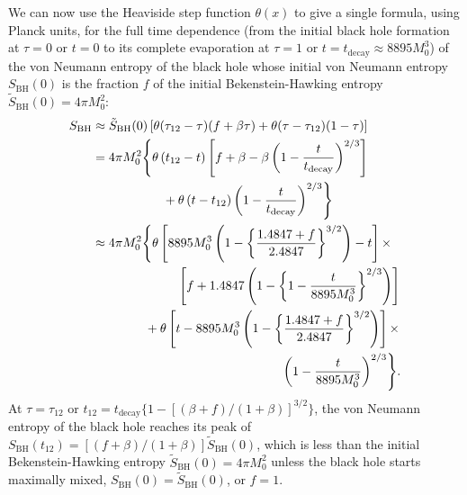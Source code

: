 \documentclass[12pt]{article}
\begin{document}
\newpage

We can now use the Heaviside step function $\theta(x)$ to give a single formula, using Planck units, for the full time dependence (from the initial black hole formation at $\tau = 0$ or $t=0$ to its complete evaporation at $\tau = 1$ or $t = t_\mathrm{decay} \approx 8895 M_0^3$) of the von Neumann entropy of the black hole whose initial von Neumann entropy $S_\mathrm{BH}(0)$ is the fraction $f$ of the initial Bekenstein-Hawking entropy $\tilde{S}_\mathrm{BH}(0) = 4\pi M_0^2$:
\begin{equation}
\begin{split}
S_\mathrm{BH} \approx {} &
\tilde{S}_\mathrm{BH}(0)
\left[\theta(\tau_{12}-\tau)(f+\beta\tau) + \theta(\tau-\tau_{12})(1-\tau)\right]
\\
= {} &
4\pi M_0^2
\Biggl\{\theta\left(t_{12}-t\right)
\left[f+\beta-\beta\left(1-\frac{t}{t_\mathrm{decay}}\right)^{2/3}\right]
\\
& \hspace{15mm} +\theta\left(t-t_{12}\right)
\left(1-\frac{t}{t_\mathrm{decay}}\right)^{2/3}\Biggr\}
\\
\approx {} &
4\pi M_0^2 \Biggl\{\theta
\left[
8895 M_0^3\left(1-\left\{\frac{1.4847+f}{2.4847}\right\}^{3/2}\right)-t\right]
\times
\\
& \hspace{19mm}
\left[f+1.4847\left(1-\left\{1-\frac{t}{8895 M_0^3}\right\}^{2/3}\right)\right]
\\
& \hspace{10mm}
+\theta\left[t-8895 M_0^3
\left(1-\left\{\frac{1.4847+f}{2.4847}\right\}^{3/2}\right)\right] \times
\\
& \hspace{48mm}
\left(1-\frac{t}{8895 M_0^3}\right)^{2/3}\Biggr\}.
\label{impure-BH-von-Neumann-entropy-evolution}
\end{split}
\end{equation}
At $\tau=\tau_{12}$ or $t_{12} = t_\mathrm{decay}\{1 - [(\beta+f)/(1+\beta)]^{3/2}\}$, the von Neumann entropy of the black hole reaches its peak of $S_\mathrm{BH}(t_{12}) = [(f+\beta)/(1+\beta)]\tilde{S}_\mathrm{BH}(0)$, which is less than the initial Bekenstein-Hawking entropy $\tilde{S}_\mathrm{BH}(0) = 4\pi M_0^2$ unless the black hole starts maximally mixed, $S_\mathrm{BH}(0) = \tilde{S}_\mathrm{BH}(0)$, or $f=1$.

\newpage
\end{document}
